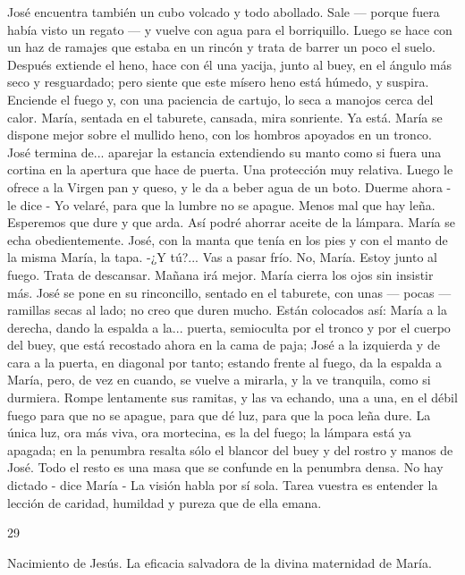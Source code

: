 \documentclass[12pt]{book} %
\begin{document}
José encuentra también un cubo volcado y todo abollado. Sale — porque fuera había visto un regato — y vuelve con agua para el borriquillo. Luego se hace con un haz de ramajes que estaba en un rincón y trata de barrer un poco el suelo. Después extiende el heno, hace con él una yacija, junto al buey, en el ángulo más seco y resguardado; pero siente que este mísero heno está húmedo, y suspira. Enciende el fuego y, con una paciencia de cartujo, lo seca a manojos cerca del calor. 
María, sentada en el taburete, cansada, mira sonriente. Ya está. María se dispone mejor sobre el mullido heno, con los hombros apoyados en un tronco. José termina de... aparejar la estancia extendiendo su manto como si fuera una cortina en la apertura que hace de puerta. Una protección muy relativa. Luego le ofrece a la Virgen pan y queso, y le da a beber agua de un boto. 
Duerme ahora - le dice - Yo velaré, para que la lumbre no se apague. Menos mal que hay leña. Esperemos que dure y 
que arda. Así podré ahorrar aceite de la lámpara. 
María se echa obedientemente. José, con la manta que tenía en los pies y con el manto de la misma María, la tapa. 
-¿Y tú?... Vas a pasar frío. 
No, María. Estoy junto al fuego. Trata de descansar. Mañana irá mejor. 
María cierra los ojos sin insistir más. José se pone en su rinconcillo, sentado en el taburete, con unas — pocas — 
ramillas secas al lado; no creo que duren mucho. 
Están colocados así: María a la derecha, dando la espalda a la... puerta, semioculta por el tronco y por el cuerpo del buey, que está recostado ahora en la cama de paja; José a la izquierda y de cara a la puerta, en diagonal por tanto; estando frente al fuego, da la espalda a María, pero, de vez en cuando, se vuelve a mirarla, y la ve tranquila, como si durmiera. Rompe lentamente sus ramitas, y las va echando, una a una, en el débil fuego para que no se apague, para que dé luz, para que la poca leña dure. La única luz, ora más viva, ora mortecina, es la del fuego; la lámpara está ya apagada; en la penumbra resalta sólo el blancor del buey y del rostro y manos de José. Todo el resto es una masa que se confunde en la penumbra densa. 
No hay dictado - dice María - La visión habla por sí sola. Tarea vuestra es entender la lección de caridad, humildad y 
pureza que de ella emana.  
 
 
29 
 
Nacimiento de Jesús. La eficacia salvadora de la divina maternidad de María. 
 
\end{document}
